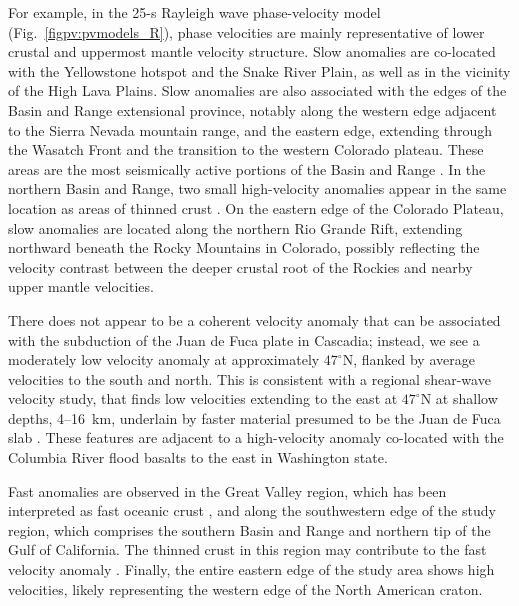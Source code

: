 \documentclass[12pt,oneside]{book}
\newcommand{\degree}[1]{\mbox{$#1^{\circ}$}}
\begin{document}
For example, in the 25\nobreakdash-s Rayleigh wave phase-velocity model (Fig.~\ref{figpv:pvmodels_R}), phase velocities are mainly representative of lower crustal and uppermost mantle velocity structure. Slow anomalies are co-located with the Yellowstone hotspot and the Snake River Plain, as well as in the vicinity of the High Lava Plains. Slow anomalies are also associated with the edges of the Basin and Range extensional province, notably along the western edge adjacent to the Sierra Nevada mountain range, and the eastern edge, extending through the Wasatch Front and the transition to the western Colorado plateau. These areas are the most seismically active portions of the Basin and Range \citep{Panchaetal2006}. In the northern Basin and Range, two small high-velocity anomalies appear in the same location as areas of thinned crust \citep{Klempereretal1986}. On the eastern edge of the Colorado Plateau, slow anomalies are located along the northern Rio Grande Rift, extending northward beneath the Rocky Mountains in Colorado, possibly reflecting the velocity contrast between the deeper crustal root of the Rockies and nearby upper mantle velocities. 

There does not appear to be a coherent velocity anomaly that can be associated with the subduction of the Juan de Fuca plate in Cascadia; instead, we see a moderately low velocity anomaly at approximately \degree{47}N, flanked by average velocities to the south and north. This is consistent with a regional shear-wave velocity study, that finds low velocities extending to the east at \degree{47}N at shallow depths, 4\nobreakdash--16~km, underlain by faster material presumed to be the Juan de Fuca slab \citep{Calkins2011}.  These features are adjacent to a high-velocity anomaly co-located with the Columbia River flood basalts to the east in Washington state. 

Fast anomalies are observed in the Great Valley region, which has been interpreted as fast oceanic crust \citep{Godfreyetal1997}, and along the southwestern edge of the study region, which comprises the southern Basin and Range and northern tip of the Gulf of California. The thinned crust in this region may contribute to the fast velocity anomaly \citep{Lewisetal2001}. Finally, the entire eastern edge of the study area shows high velocities, likely representing the western edge of the North American craton. 
\end{document}
